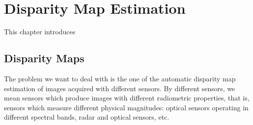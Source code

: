 \chapter{Disparity Map Estimation}


This chapter introduces 


\section{Disparity Maps}
\ifitkFullVersion
\label{sec:DisparityMaps}
\fi

The problem we want to deal with is the one of the
automatic disparity map estimation of images acquired with different sensors. By different
sensors, we mean sensors which produce images with different
radiometric properties, that is, sensors which measure different
physical magnitudes: optical sensors operating in different spectral
bands, radar and optical sensors, etc.\\




